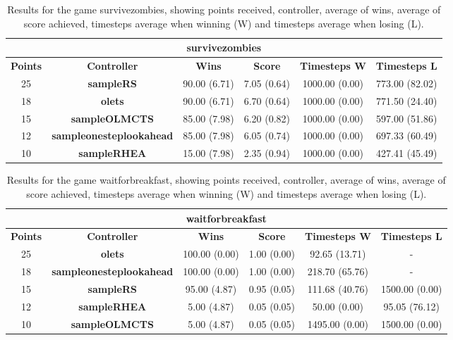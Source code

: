 \begin{table*}[!t]
\begin{center}
\begin{tabular}{|c|c|c|c|c|c|}
\multicolumn{6}{c}{\textbf{survivezombies}}\\
\hline
\textbf{Points} & \textbf{Controller} & \textbf{Wins} &  \textbf{Score} & \textbf{Timesteps W} & \textbf{Timesteps L}\\
\hline
25 & \textbf{sampleRS} & 90.00 (6.71) & 7.05 (0.64) & 1000.00 (0.00) & 773.00 (82.02)
 \\
\hline
18 & \textbf{olets} & 90.00 (6.71) & 6.70 (0.64) & 1000.00 (0.00) & 771.50 (24.40)
 \\
\hline
15 & \textbf{sampleOLMCTS} & 85.00 (7.98) & 6.20 (0.82) & 1000.00 (0.00) & 597.00 (51.86)
 \\
\hline
12 & \textbf{sampleonesteplookahead} & 85.00 (7.98) & 6.05 (0.74) & 1000.00 (0.00) & 697.33 (60.49)
 \\
\hline
10 & \textbf{sampleRHEA} & 15.00 (7.98) & 2.35 (0.94) & 1000.00 (0.00) & 427.41 (45.49)
 \\
\hline
\end{tabular}
\caption{Results for the game survivezombies, showing points received, controller, average of wins, average of score achieved, timesteps average when winning (W) and timesteps average when losing (L).}
\label{tab:weights}
\end{center}
\end{table*}
\begin{table*}[!t]
\begin{center}
\begin{tabular}{|c|c|c|c|c|c|}
\multicolumn{6}{c}{\textbf{waitforbreakfast}}\\
\hline
\textbf{Points} & \textbf{Controller} & \textbf{Wins} &  \textbf{Score} & \textbf{Timesteps W} & \textbf{Timesteps L}\\
\hline
25 & \textbf{olets} & 100.00 (0.00) & 1.00 (0.00) & 92.65 (13.71) &  - 
 \\
\hline
18 & \textbf{sampleonesteplookahead} & 100.00 (0.00) & 1.00 (0.00) & 218.70 (65.76) &  - 
 \\
\hline
15 & \textbf{sampleRS} & 95.00 (4.87) & 0.95 (0.05) & 111.68 (40.76) & 1500.00 (0.00)
 \\
\hline
12 & \textbf{sampleRHEA} & 5.00 (4.87) & 0.05 (0.05) & 50.00 (0.00) & 95.05 (76.12)
 \\
\hline
10 & \textbf{sampleOLMCTS} & 5.00 (4.87) & 0.05 (0.05) & 1495.00 (0.00) & 1500.00 (0.00)
 \\
\hline
\end{tabular}
\caption{Results for the game waitforbreakfast, showing points received, controller, average of wins, average of score achieved, timesteps average when winning (W) and timesteps average when losing (L).}
\label{tab:weights}
\end{center}
\end{table*}
